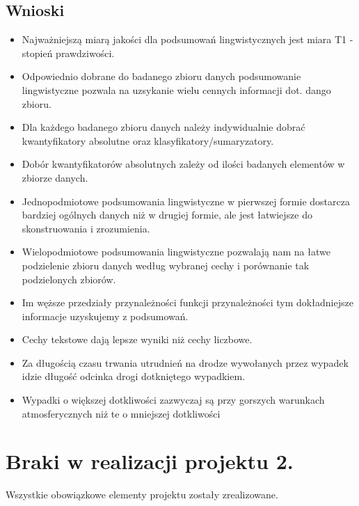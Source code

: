 \documentclass{classrep}
\begin{document}
\subsection{Wnioski}

\begin{itemize}
\item Najważniejszą miarą jakości dla podsumowań lingwistycznych jest miara T1 -  stopień prawdziwości.
\item Odpowiednio dobrane do badanego zbioru danych podsumowanie lingwistyczne pozwala na uzsykanie wielu cennych informacji dot. dango zbioru.
\item Dla każdego badanego zbioru danych należy indywidualnie dobrać kwantyfikatory absolutne oraz klasyfikatory/sumaryzatory.
\item Dobór kwantyfikatorów absolutnych zależy od ilości badanych elementów w zbiorze danych.
\item Jednopodmiotowe podsumowania lingwistyczne w pierwszej formie dostarcza bardziej ogólnych danych niż w drugiej formie, ale jest łatwiejsze do skonstruowania i zrozumienia.
\item Wielopodmiotowe podsumowania lingwistyczne pozwalają nam na łatwe podzielenie zbioru danych według wybranej cechy i porównanie tak podzielonych zbiorów.
\item Im węższe przedziały przynależności funkcji przynależności tym dokładniejsze informacje uzyskujemy z podsumowań.
\item Cechy tekstowe dają lepsze wyniki niż cechy liczbowe. 
\item Za długością czasu trwania utrudnień na drodze wywołanych przez wypadek idzie długość odcinka drogi dotkniętego wypadkiem.
\item Wypadki o większej dotkliwości zazwyczaj są przy gorszych warunkach atmosferycznych niż te o mniejszej dotkliwości
\end{itemize}



\section{Braki w realizacji projektu 2.}
Wszystkie obowiązkowe elementy projektu zostały zrealizowane.
\end{document}
